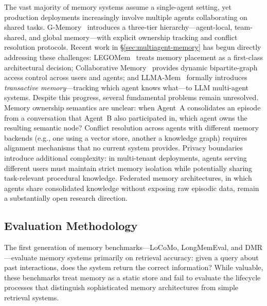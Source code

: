 The vast majority of memory systems assume a single-agent setting, yet
production deployments increasingly involve multiple agents
collaborating on shared tasks. G-Memory~\cite{zhang2025gmemory}
introduces a three-tier hierarchy---agent-local, team-shared, and
global memory---with explicit ownership tracking and conflict
resolution protocols. Recent work in \S\ref{sec:multiagent-memory}
has begun directly addressing these challenges:
LEGOMem~\cite{legomem2025} treats memory placement as a first-class
architectural decision; Collaborative Memory~\cite{collaborativemem2025}
provides dynamic bipartite-graph access control across users and
agents; and LLMA-Mem~\cite{llmamem2026} formally introduces
\emph{transactive memory}---tracking which agent knows what---to
LLM multi-agent systems.  Despite this progress, several fundamental
problems remain unresolved. Memory ownership semantics are unclear:
when Agent~A consolidates an episode from a conversation that
Agent~B also participated in, which agent owns the resulting semantic
node? Conflict resolution across agents with different memory backends
(e.g., one using a vector store, another a knowledge graph) requires
alignment mechanisms that no current system provides. Privacy
boundaries introduce additional complexity: in multi-tenant
deployments, agents serving different users must maintain strict memory
isolation while potentially sharing task-relevant procedural knowledge.
Federated memory architectures, in which agents share consolidated
knowledge without exposing raw episodic data, remain a substantially
open research direction.

\subsection{Evaluation Methodology}

The first generation of memory benchmarks---LoCoMo, LongMemEval, and
DMR---evaluate memory systems primarily on retrieval accuracy: given a
query about past interactions, does the system return the correct
information?  While valuable, these benchmarks treat memory as a static
store and fail to evaluate the lifecycle processes that distinguish
sophisticated memory architectures from simple retrieval systems.

